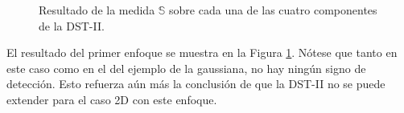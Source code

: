 \begin{figure}
\begin{center}
\begin{multicols}{2}
	\end{multicols}
	\end{center}
\caption{Resultado de la medida $\mathbb{S}$ sobre cada una de las cuatro componentes de la DST-II.} \label{fig:example-mm-approach1}
\end{figure}

El resultado del primer enfoque se muestra en la Figura \ref{fig:example-mm-approach1}. Nótese que
tanto en este caso como en el
del ejemplo de la gaussiana, no hay ningún signo de detección. Esto refuerza aún más la conclusión de que la DST-II no se puede
extender para el caso 2D con este enfoque.

